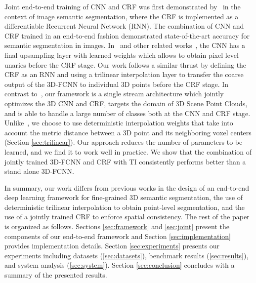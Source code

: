 \documentclass[10pt,twocolumn,letterpaper]{article}
\newcommand{\fccrf}[0]{CRF\xspace}
\newcommand{\threedfcnn}[0]{3D-FCNN\xspace}
\newcommand{\crf}[0]{CRF\xspace}
\begin{document}
Joint end-to-end training of CNN and CRF was first demonstrated by~\cite{Zheng2015} in the context of image semantic segmentation, where the CRF is implemented as a differentiable Recurrent Neural Network (RNN). The combination of CNN and CRF trained in an end-to-end fashion demonstrated state-of-the-art accuracy for semantic segmentation in images. In~\cite{Zheng2015} and other related works~\cite{fcnn, Deeplab}, the CNN has a final upsampling layer with learned weights which allows to obtain pixel level unaries before the CRF stage. Our work follows a similar thrust by defining the CRF as an RNN and using a trilinear interpolation layer to transfer the coarse output of the \threedfcnn to individual 3D points before the CRF stage. In contrast to~\cite{Kamnitsas2017}, our framework is a single stream architecture which jointly optimizes the 3D CNN and \crf, targets the domain of 3D Scene Point Clouds, and is able to handle a large number of classes both at the CNN and CRF stage. Unlike~\cite{Zheng2015,fcnn, Deeplab}, we choose to use deterministic interpolation weights that take into account the metric distance between a 3D point and its neighboring voxel centers (Section \ref{sec:trilinear}). Our approach reduces the number of parameters to be learned, and we find it to work well in practice. We show that the combination of jointly trained \threedfcnn and \crf with TI consistently performs better than a stand alone \threedfcnn.

In summary, our work differs from previous works in the design of an end-to-end deep learning framework for fine-grained 3D semantic segmentation, the use of deterministic trilinear interpolation to obtain point-level segmentation, and the use of a jointly trained \fccrf to enforce spatial consistency. The rest of the paper is organized as follows. Sections \ref{sec:framework} and \ref{sec:joint} present the components of our end-to-end framework and Section \ref{sec:implementation} provides implementation details. Section \ref{sec:experiments} presents our experiments including datasets (\ref{sec:datasets}), benchmark results (\ref{sec:results}), and system analysis (\ref{sec:system}). Section \ref{sec:conclusion} concludes with a summary of the presented results. 
\end{document}
